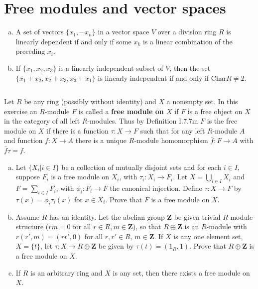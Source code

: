 \section{Free modules and vector spaces}
\begin{ex}
    \begin{enumerate}[(a)]
        \item A set of vectors $\{x_{1},\cdots x_{n}\}$ in a vector space $V$ over a division ring $R$ is linearly dependent if and only if some $x_{k}$ is a linear combination of the preceding $x_{i}$.
        \item If $\{x_{1},x_{2},x_{3}\}$ is a linearly independent subset of $V$, then the set $\{x_{1}+x_{2},x_{2}+x_{3},x_{3}+x_{1}\}$ is linearly independent if and only if $\mathrm{Char}R\neq 2$.
    \end{enumerate}
\end{ex}

$$ $$

\begin{ex}
    Let $R$ be any ring (possibly without identity) and $X$ a nonempty set. In this exercise an $R$-module $F$ is called a \textbf{free module on $X$} if $F$ is a free object on $X$ in the category of all left $R$-modules. Thus by Definition I.7.7m $F$ is the free module on $X$ if there is a function $\tau:X\to F$ such that for any left $R$-module $A$ and function $f:X\to A$ there is a unique $R$-module homomorphism $\bar{f}:F\to A$ with $\bar{f}\tau=f$.
    \begin{enumerate}[(a)]
        \item Let $\{X_{i}|i\in I\}$ be a collection of mutually disjoint sets and for each $i\in I$, suppose $F_{i}$ is a free module on $X_{i}$, with $\tau_{i}:X_{i}\to F_{i}$. Let $X=\bigcup\limits_{i\in I}X_{i}$ and $F=\sum\limits_{i\in I}F_{i}$, with $\phi_{i}:F_{i}\to F$ the canonical injection. Define $\tau:X\to F$ by $\tau(x)=\phi_{i}\tau_{i}(x)$ for $x\in X_{i}$. Prove that $F$ is a free module on $X$.
        \item Assume $R$ has an identity. Let the abelian group $\mathbf{Z}$ be given trivial $R$-module structure ($rm=0$ for all $r\in R, m\in\mathbf{Z}$), so that $R\oplus\mathbf{Z}$ is an $R$-module with $r(r',m)=(rr',0)$ for all $r,r'\in R$, $m\in \mathbf{Z}$. If $X$ is any one element set, $X=\{t\}$, let $\tau:X\to R\oplus\mathbf{Z}$ be given by $\tau(t)=(1_{R},1)$. Prove that $R\oplus\mathbf{Z}$ is a free module on $X$.
        \item If $R$ is an arbitrary ring and $X$ is any set, then there exists a free module on $X$.
    \end{enumerate}
\end{ex}